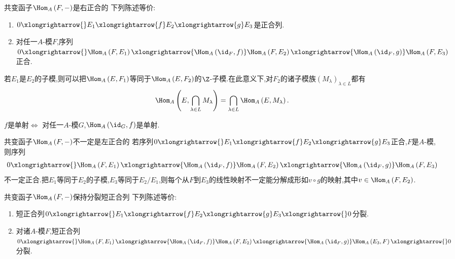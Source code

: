 \begin{theorem}{共变函子$\Hom_{A}\left(F,-\right)$是右正合的}{}
	下列陈述等价:
	\begin{enumerate}
		\item $0\xlongrightarrow{}E_{1}\xlongrightarrow{f}E_{2}\xlongrightarrow{g}E_{3}$是正合列.
		\item 对任一$A$-模$F$,序列$0\xlongrightarrow{}\Hom_{A}\left(F,E_{1}\right)\xlongrightarrow{\Hom_{A}\left(\id_{F},f\right)}\Hom_{A}\left(F,E_{2}\right)\xlongrightarrow{\Hom_{A}\left(\id_{F},g\right)}\Hom_{A}\left(F,E_{3}\right)$正合.
	\end{enumerate}
\end{theorem}

\begin{remark}{}{}
	若$E_{1}$是$E_{2}$的子模,则可以把$\Hom_{A}\left(E,F_{1}\right)$等同于$\Hom_{A}\left(E,F_{2}\right)$的$\Z$-子模.在此意义下,对$F_{2}$的诸子模族$\left(M_{\lambda}\right)_{\lambda\in L}$都有
	\begin{align*}
		\Hom_{A}\left(E,\bigcap\limits_{\lambda\in L}M_{\lambda}\right)=\bigcap\limits_{\lambda\in L}\Hom_{A}\left(E,M_{\lambda}\right).
	\end{align*}
\end{remark}

\begin{corollary}{}{}
	$f$是单射$\iff$ 对任一$A$-模$G$,$\Hom_{A}\left(\id_{G},f\right)$是单射.
\end{corollary}

\begin{remark}{共变函子$\Hom_{A}\left(F,-\right)$不一定是左正合的}{}
	若序列$0\xlongrightarrow{}E_{1}\xlongrightarrow{f}E_{2}\xlongrightarrow{g}E_{3}$正合,$F$是$A$-模,则序列
	\begin{align*}
		0\xlongrightarrow{}\Hom_{A}\left(F,E_{1}\right)\xlongrightarrow{\Hom_{A}\left(\id_{F},f\right)}\Hom_{A}\left(F,E_{2}\right)\xlongrightarrow{\Hom_{A}\left(\id_{F},g\right)}\Hom_{A}\left(F,E_{3}\right)
	\end{align*}
	不一定正合.把$E_{1}$等同于$E_{2}$的子模,$E_{3}$等同于$E_{2}/E_{1}$,则每个从$F$到$E_{3}$的线性映射不一定能分解成形如$v\circ g$的映射,其中$v\in\Hom_{A}\left(F,E_{2}\right)$.
\end{remark}

\begin{proposition}{共变函子$\Hom_{A}\left(F,-\right)$保持分裂短正合列}{}
	下列陈述等价:
	\begin{enumerate}
		\item 短正合列$0\xlongrightarrow{}E_{1}\xlongrightarrow{f}E_{2}\xlongrightarrow{g}E_{3}\xlongrightarrow{}0$分裂.
		\item 对诸$A$-模$F$,短正合列$0\xlongrightarrow{}\Hom_{A}\left(F,E_{1}\right)\xlongrightarrow{\Hom_{A}\left(\id_{F},f\right)}\Hom_{A}\left(F,E_{2}\right)\xlongrightarrow{\Hom_{A}\left(\id_{F},g\right)}\Hom_{A}\left(E_{3},F\right)\xlongrightarrow{}0$分裂.
	\end{enumerate}
\end{proposition}